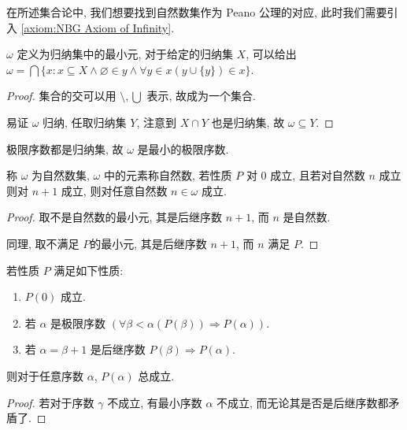 在所述集合论中, 我们想要找到自然数集作为 Peano 公理的对应, 此时我们需要引入 \ref{axiom:NBG Axiom of Infinity}.

\begin{definition}
    \label{definition:omega}
    \(\omega\) 定义为归纳集中的最小元, 对于给定的归纳集 \(X\), 可以给出 \(\omega = \bigcap \{x : x \subseteq X \land \varnothing \in y \land \forall y \in x (y \cup \{y\}) \in x\}\).

    \begin{proof}
        集合的交可以用 \(\setminus, \bigcup\) 表示, 故成为一个集合.

        易证 \(\omega\) 归纳, 任取归纳集 \(Y\), 注意到 \(X \cap Y\) 也是归纳集, 故 \(\omega \subseteq Y\).
    \end{proof}
\end{definition}

\begin{corollary}
    极限序数都是归纳集, 故 \(\omega\) 是最小的极限序数.
\end{corollary}

\begin{theorem}[数学归纳法]
    \label{theorem:mathematical induction}
    称 \(\omega\) 为自然数集, \(\omega\) 中的元素称自然数, 若性质 \(P\) 对 \(0\) 成立, 且若对自然数 \(n\) 成立则对 \(n+1\) 成立, 则对任意自然数 \(n \in \omega\) 成立.
    
    \begin{proof}
        取不是自然数的最小元, 其是后继序数 \(n+1\), 而 \(n\) 是自然数.

        同理, 取不满足 \(P\)的最小元, 其是后继序数 \(n+1\), 而 \(n\) 满足 \(P\).
    \end{proof}
\end{theorem}

\begin{theorem}[超限归纳法]
    \label{theorem:transfinite induction}
    若性质 \(P\) 满足如下性质:
    \begin{enumerate}
        \item \(P(0)\) 成立.
        \item 若 \(\alpha\) 是极限序数 \((\forall \beta < \alpha (P(\beta)) \Rightarrow P(\alpha))\).
        \item 若 \(\alpha = \beta + 1\) 是后继序数 \(P(\beta) \Rightarrow P(\alpha)\).
    \end{enumerate}

    则对于任意序数 \(\alpha\), \(P(\alpha)\) 总成立.

    \begin{proof}
        若对于序数 \(\gamma\) 不成立, 有最小序数 \(\alpha\) 不成立, 而无论其是否是后继序数都矛盾了.
    \end{proof}
\end{theorem}

